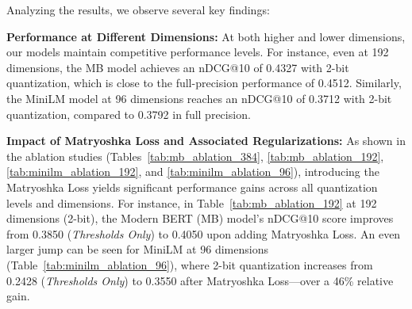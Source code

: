 \begin{table}[ht]
\caption{Ablation study for MiniLM model at 96 dimensions.}
\label{tab:minilm_ablation_96}
\centering
{}
\end{table}
Analyzing the results, we observe several key findings:

\textbf{Performance at Different Dimensions:} At both higher and lower dimensions, our models maintain competitive performance levels. For instance, even at 192 dimensions, the MB model achieves an nDCG@10 of 0.4327 with 2-bit quantization, which is close to the full-precision performance of 0.4512. Similarly, the MiniLM model at 96 dimensions reaches an nDCG@10 of 0.3712 with 2-bit quantization, compared to 0.3792 in full precision.


\textbf{Impact of Matryoshka Loss and Associated Regularizations:} 
As shown in the ablation studies (Tables~\ref{tab:mb_ablation_384}, \ref{tab:mb_ablation_192}, \ref{tab:minilm_ablation_192}, and \ref{tab:minilm_ablation_96}), introducing the Matryoshka Loss yields significant performance gains across all quantization levels and dimensions. For instance, in Table~\ref{tab:mb_ablation_192} at 192 dimensions (2-bit), the Modern BERT (MB) model's nDCG@10 score improves from 0.3850 (\textit{Thresholds Only}) to 0.4050 upon adding Matryoshka Loss. An even larger jump can be seen for MiniLM at 96 dimensions (Table~\ref{tab:minilm_ablation_96}), where 2-bit quantization increases from 0.2428 (\textit{Thresholds Only}) to 0.3550 after Matryoshka Loss—over a 46\% relative gain.


